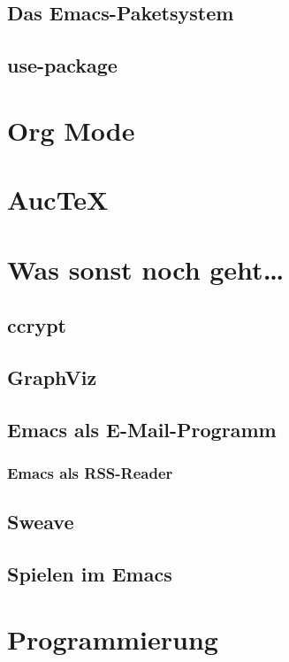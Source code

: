 \documentclass[12pt,ngerman]{scrbook}
\begin{document}
\section{Das Emacs-Paketsystem}

\section{use-package}

\chapter{Org Mode}

\chapter{Auc\TeX}

\chapter{Was sonst noch geht\ldots}

\section{ccrypt}

\section{GraphViz}

\section{Emacs als E-Mail-Programm}

\subsection{Emacs als RSS-Reader}

\section{Sweave}

\section{Spielen im Emacs}

\chapter{Programmierung}
\end{document}
